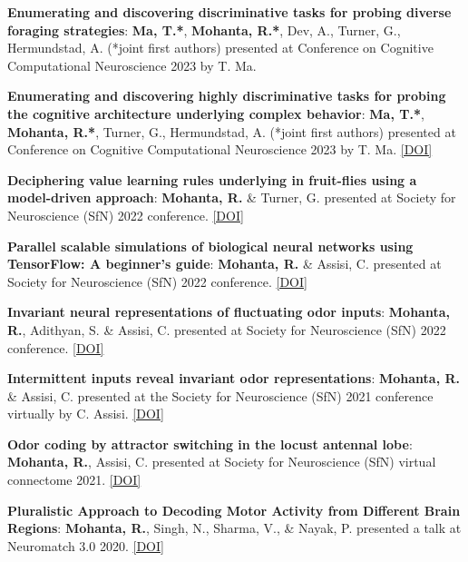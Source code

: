 \documentclass[letterpaper,9pt]{article}
\newcommand{\resumeItem}[2]{
  \item\small{
    \textbf{#1}{: #2 \vspace{-2pt}}
  }
}
\newcommand{\resumeSubItem}[2]{\resumeItem{#1}{#2}\vspace{-4pt}}
\begin{document}
    \resumeSubItem{Enumerating and discovering discriminative tasks for probing diverse foraging strategies}
    {\textbf{Ma, T.*}, \textbf{Mohanta, R.*}, Dev, A., Turner, G., Hermundstad, A. (*joint first authors) presented at Conference on Cognitive Computational Neuroscience 2023 by T. Ma.}

    \resumeSubItem{Enumerating and discovering highly discriminative tasks for probing the cognitive architecture underlying complex behavior}
      {\textbf{Ma, T.*}, \textbf{Mohanta, R.*}, Turner, G., Hermundstad, A. (*joint first authors) presented at Conference on Cognitive Computational Neuroscience 2023 by T. Ma. \href{https://www.doi.org/10.32470/CCN.2023.1217-0}{[DOI]}}
    
    \resumeSubItem{Deciphering value learning rules underlying in fruit-flies using a model-driven approach}
      {\textbf{Mohanta, R.} \& Turner, G. presented at Society for Neuroscience (SfN) 2022 conference. \href{https://doi.org/10.6084/m9.figshare.21383697}{[DOI]}}
    
    \resumeSubItem{Parallel scalable simulations of biological neural networks using TensorFlow: A beginner's guide}
      {\textbf{Mohanta, R.} \& Assisi, C. presented at Society for Neuroscience (SfN) 2022 conference. \href{https://doi.org/10.6084/m9.figshare.21383895}{[DOI]}}
    
    \resumeSubItem{Invariant neural representations of fluctuating odor inputs}
      {\textbf{Mohanta, R.}, Adithyan, S. \& Assisi, C. presented at Society for Neuroscience (SfN) 2022 conference. \href{https://doi.org/10.6084/m9.figshare.21383898}{[DOI]}}
    
    \resumeSubItem{Intermittent inputs reveal invariant odor representations}
      {\textbf{Mohanta, R.} \& Assisi, C. presented at the Society for Neuroscience (SfN) 2021 conference virtually by C. Assisi. \href{https://doi.org/10.6084/m9.figshare.18972815.v2}{[DOI]}}
    
    \resumeSubItem{Odor coding by attractor switching in the locust antennal lobe}
      {\textbf{Mohanta, R.}, Assisi, C. presented at Society for Neuroscience (SfN) virtual connectome 2021. \href{https://doi.org/10.6084/m9.figshare.13517570.v1}{[DOI]}}
    
    \resumeSubItem{Pluralistic Approach to Decoding Motor Activity from Different Brain Regions}
      {\textbf{Mohanta, R.}, Singh, N., Sharma, V., \& Nayak, P. presented a talk at Neuromatch 3.0 2020. \href{https://doi.org/10.6084/m9.figshare.13164365.v1}{[DOI]}}
    
\end{document}
